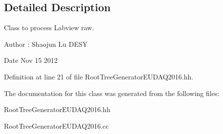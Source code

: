 \subsection{Detailed Description}
Class to process Labview raw. \begin{DoxyAuthor}{Author}
: Shaojun Lu DESY 
\end{DoxyAuthor}
\begin{DoxyDate}{Date}
Nov 15 2012 
\end{DoxyDate}


Definition at line 21 of file RootTreeGeneratorEUDAQ2016.hh.

The documentation for this class was generated from the following files:\begin{DoxyCompactItemize}
\item 
RootTreeGeneratorEUDAQ2016.hh\item 
RootTreeGeneratorEUDAQ2016.cc\end{DoxyCompactItemize}
